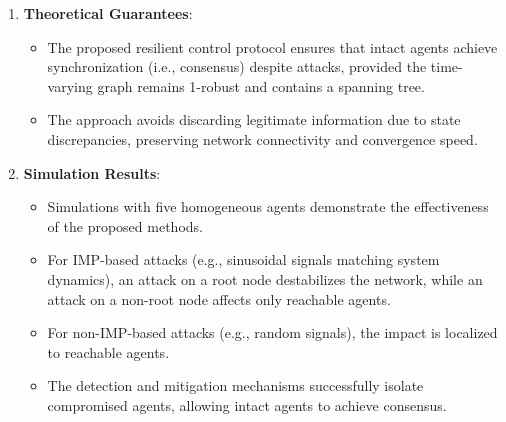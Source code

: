 \documentclass{article}
\begin{document}
\begin{enumerate}
    \item \textbf{Theoretical Guarantees}:
    \begin{itemize}
        \item The proposed resilient control protocol ensures that intact agents achieve synchronization (i.e., consensus) despite attacks, provided the time-varying graph remains 1-robust and contains a spanning tree.
        \item The approach avoids discarding legitimate information due to state discrepancies, preserving network connectivity and convergence speed.
    \end{itemize}

    \item \textbf{Simulation Results}:
    \begin{itemize}
        \item Simulations with five homogeneous agents demonstrate the effectiveness of the proposed methods.
        \item For IMP-based attacks (e.g., sinusoidal signals matching system dynamics), an attack on a root node destabilizes the network, while an attack on a non-root node affects only reachable agents.
        \item For non-IMP-based attacks (e.g., random signals), the impact is localized to reachable agents.
        \item The detection and mitigation mechanisms successfully isolate compromised agents, allowing intact agents to achieve consensus.
    \end{itemize}
\end{enumerate}
\end{document}
